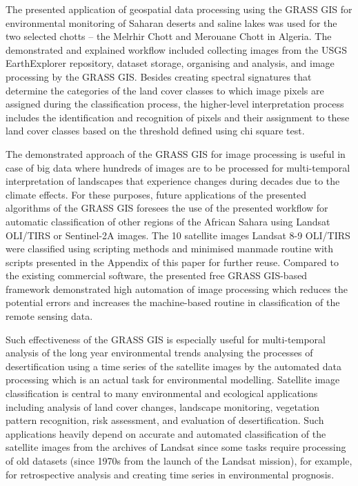 \documentclass[asi,article,submit,pdftex,moreauthors]{Definitions/mdpi}
\begin{document}
The presented application of geospatial data processing using the GRASS GIS for environmental monitoring of Saharan deserts and saline lakes was used for the two selected chotts -- the Melrhir Chott and Merouane Chott in Algeria. The demonstrated and explained workflow included collecting images from the USGS EarthExplorer repository, dataset storage, organising and analysis, and image processing by the GRASS GIS. Besides creating spectral signatures that determine the categories of the land cover classes to which image pixels are assigned during the classification process, the higher-level interpretation process includes the identification and recognition of pixels and their assignment to these land cover classes based on the threshold defined using chi square test. 

The demonstrated approach of the GRASS GIS for image processing is useful in case of big data where hundreds of images are to be processed for multi-temporal interpretation of landscapes that experience changes during decades due to the climate effects. For these purposes, future applications of the presented algorithms of the GRASS GIS foresees the use of the presented workflow for automatic classification of other regions of the African Sahara using Landsat OLI/TIRS or Sentinel-2A images. The 10 satellite images Landsat 8-9 OLI/TIRS were classified using scripting methods and minimised manmade routine with scripts presented in the Appendix of this paper for further reuse. Compared to the existing commercial software, the presented free GRASS GIS-based framework demonstrated high automation of image processing which reduces the potential errors and increases the machine-based routine in classification of the remote sensing data. 

Such effectiveness of the GRASS GIS is especially useful for multi-temporal analysis of the long year environmental trends analysing the processes of desertification using a time series of the satellite images by the automated data processing which is an actual task for environmental modelling. Satellite image classification is central to many environmental and ecological applications including analysis of land cover changes, landscape monitoring, vegetation pattern recognition, risk assessment, and evaluation of desertification. Such applications heavily depend on accurate and automated classification of the satellite images from the archives of Landsat since some tasks require processing of old datasets (since 1970s from the launch of the Landsat mission), for example, for retrospective analysis and creating time series in environmental prognosis. 
\end{document}
